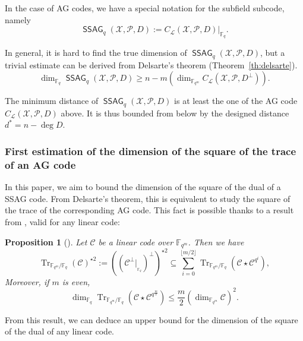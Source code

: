 \documentclass[a4paper]{article}
\newtheorem{proposition}[thm]{Proposition}
\theoremstyle{definition}
\theoremstyle{remark}
\newcommand{\calP}{\mathcal{P}}
\newcommand{\calL}{\mathcal{L}}
\newcommand{\calC}{\mathcal{C}}
\newcommand{\calX}{\mathcal{X}}
\newcommand{\fqm}{\mathbb{F}_{q^m}}
\newcommand{\fq}{\mathbb{F}_{q}}
\newcommand{\Tr}[1]{\operatorname{Tr}_{\mathbb{F}_{q^m}/\fq}\left(#1\right)}
\newcommand{\ssag}[1]{\operatorname{\mathsf{SSAG}}_{q}\left(#1\right)}
\begin{document}
In the case of AG codes, we have a special notation for the subfield subcode, namely
\[\ssag{\calX,\calP,D} := C_{\calL}(\calX,\calP,D)|_{\fq}.\]

In general, it is hard to find the true dimension of $\ssag{\calX,\calP,D}$, but a trivial estimate can be derived from Delsarte's theorem (Theorem~\ref{th:delsarte}).
\begin{equation}\label{eq:dim_ssag}
	\dim_{\fq} \ssag{\calX,\calP,D} \geq n - m(\dim_{\fqm} C_{\calL}(\calX,\calP,D^{\perp})).
\end{equation}

The minimum distance of $\ssag{\calX,\calP,D}$ is at least the one of the AG code $C_{\calL}(\calX,\calP,D)$ above. It is thus bounded from below by the designed distance $d^*=n-\deg D$.%


\subsubsection{First estimation of the dimension of the square of the trace of an AG code}

In this paper, we aim to bound the dimension of the square of the dual of a SSAG code. From Delsarte's theorem, this is equivalent to study the square of the trace of the corresponding AG code. 
This fact is possible thanks to a result from \cite{MT21}, valid for any linear code:

\begin{proposition}[{\cite[Proposition~15]{MT21}}] \label{prop:Tr_BoundSchurSquare}
 Let $\calC$ be a linear code over $\fqm$. Then we have 
 \begin{equation} \label{eq:key_equation} \Tr{\calC}^{\star2} := ((\calC^{\perp}|_{_{{\mathbb{F}_q}}})^{\perp})^{\star2} \subseteq \sum\limits_{i=0}^{\lfloor{m/2} \rfloor} \Tr{\calC\star \calC^{q^i}},
 \end{equation}
Moreover, if $m$ is even, 
 \begin{equation} \label{eq:dim_m/2} \dim_{\fq} \Tr{\calC\star \calC^{q^{\frac{m}{2}}}} \leq \frac{m}{2} (\dim_{\fqm}\calC)^2.
\end{equation}
\end{proposition}
From this result, we can deduce an upper bound for the dimension of the square of the dual of any linear code.
\end{document}
